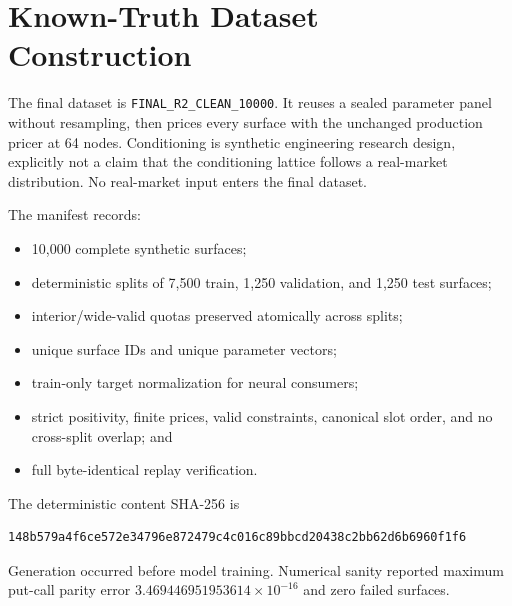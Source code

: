 \section{Known-Truth Dataset Construction}
\label{sec:dataset-construction}

The final dataset is \texttt{FINAL\_R2\_CLEAN\_10000}. It reuses a sealed parameter
panel without resampling, then prices every surface with the unchanged production
pricer at 64 nodes. Conditioning is synthetic engineering research design, explicitly
not a claim that the conditioning lattice follows a real-market distribution. No
real-market input enters the final dataset.

The manifest records:
\begin{itemize}
    \item 10{,}000 complete synthetic surfaces;
    \item deterministic splits of 7{,}500 train, 1{,}250 validation, and 1{,}250 test
          surfaces;
    \item interior/wide-valid quotas preserved atomically across splits;
    \item unique surface IDs and unique parameter vectors;
    \item train-only target normalization for neural consumers;
    \item strict positivity, finite prices, valid constraints, canonical slot order,
          and no cross-split overlap; and
    \item full byte-identical replay verification.
\end{itemize}

The deterministic content SHA-256 is
\begin{verbatim}
148b579a4f6ce572e34796e872479c4c016c89bbcd20438c2bb62d6b6960f1f6
\end{verbatim}
Generation occurred before model training. Numerical sanity reported maximum
put-call parity error $3.469446951953614\times10^{-16}$ and zero failed surfaces.
